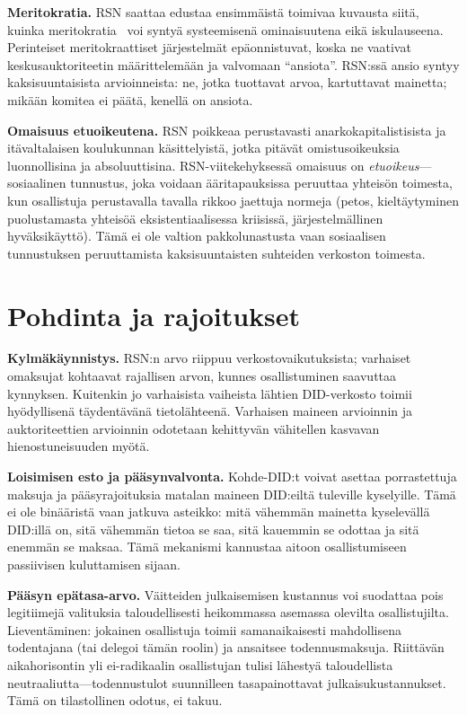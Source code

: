 \documentclass[11pt,a4paper,twocolumn]{article}
\begin{document}
\textbf{Meritokratia.} RSN saattaa edustaa ensimmäistä toimivaa kuvausta siitä, kuinka meritokratia~\cite{young1958} voi syntyä systeemisenä ominaisuutena eikä iskulauseena. Perinteiset meritokraattiset järjestelmät epäonnistuvat, koska ne vaativat keskusauktoriteetin määrittelemään ja valvomaan ``ansiota''. RSN:ssä ansio syntyy kaksisuuntaisista arvioinneista: ne, jotka tuottavat arvoa, kartuttavat mainetta; mikään komitea ei päätä, kenellä on ansiota.

\textbf{Omaisuus etuoikeutena.} RSN poikkeaa perustavasti anarkokapitalistisista ja itävaltalaisen koulukunnan käsittelyistä, jotka pitävät omistusoikeuksia luonnollisina ja absoluuttisina. RSN-viitekehyksessä omaisuus on \emph{etuoikeus}---sosiaalinen tunnustus, joka voidaan ääritapauksissa peruuttaa yhteisön toimesta, kun osallistuja perustavalla tavalla rikkoo jaettuja normeja (petos, kieltäytyminen puolustamasta yhteisöä eksistentiaalisessa kriisissä, järjestelmällinen hyväksikäyttö). Tämä ei ole valtion pakkolunastusta vaan sosiaalisen tunnustuksen peruuttamista kaksisuuntaisten suhteiden verkoston toimesta.

\section{Pohdinta ja rajoitukset}

\textbf{Kylmäkäynnistys.} RSN:n arvo riippuu verkostovaikutuksista; varhaiset omaksujat kohtaavat rajallisen arvon, kunnes osallistuminen saavuttaa kynnyksen. Kuitenkin jo varhaisista vaiheista lähtien DID-verkosto toimii hyödyllisenä täydentävänä tietolähteenä. Varhaisen maineen arvioinnin ja auktoriteettien arvioinnin odotetaan kehittyvän vähitellen kasvavan hienostuneisuuden myötä.

\textbf{Loisimisen esto ja pääsynvalvonta.} Kohde-DID:t voivat asettaa porrastettuja maksuja ja pääsyrajoituksia matalan maineen DID:eiltä tuleville kyselyille. Tämä ei ole binääristä vaan jatkuva asteikko: mitä vähemmän mainetta kyselevällä DID:illä on, sitä vähemmän tietoa se saa, sitä kauemmin se odottaa ja sitä enemmän se maksaa. Tämä mekanismi kannustaa aitoon osallistumiseen passiivisen kuluttamisen sijaan.

\textbf{Pääsyn epätasa-arvo.} Väitteiden julkaisemisen kustannus voi suodattaa pois legitiimejä valituksia taloudellisesti heikommassa asemassa olevilta osallistujilta. Lieventäminen: jokainen osallistuja toimii samanaikaisesti mahdollisena todentajana (tai delegoi tämän roolin) ja ansaitsee todennusmaksuja. Riittävän aikahorisontin yli ei-radikaalin osallistujan tulisi lähestyä taloudellista neutraaliutta---todennustulot suunnilleen tasapainottavat julkaisukustannukset. Tämä on tilastollinen odotus, ei takuu.
\end{document}

